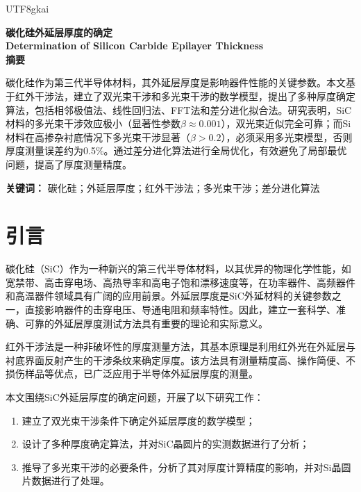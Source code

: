 \documentclass[12pt,a4paper]{article}
\begin{document}
\begin{CJK}{UTF8}{gkai}

\begin{center}
{\fontsize{16pt}{18pt}\selectfont\textbf{碳化硅外延层厚度的确定}}\\[8pt]
{\fontsize{14pt}{16pt}\selectfont\textbf{Determination of Silicon Carbide Epilayer Thickness}}\\[15pt]
{\fontsize{12pt}{14pt}\selectfont\textbf{摘要}}\\[5pt]
\end{center}

\noindent
碳化硅作为第三代半导体材料，其外延层厚度是影响器件性能的关键参数。本文基于红外干涉法，建立了双光束干涉和多光束干涉的数学模型，提出了多种厚度确定算法，包括相邻极值法、线性回归法、FFT法和差分进化拟合法。研究表明，SiC材料的多光束干涉效应极小（显著性参数$\beta\approx0.001$），双光束近似完全可靠；而Si材料在高掺杂衬底情况下多光束干涉显著（$\beta>0.2$），必须采用多光束模型，否则厚度测量误差约为0.5\%。通过差分进化算法进行全局优化，有效避免了局部最优问题，提高了厚度测量精度。

\vspace{8pt}

\noindent
{\textbf{关键词：}} 碳化硅；外延层厚度；红外干涉法；多光束干涉；差分进化算法

\vspace{15pt}

\section{引言}

碳化硅（SiC）作为一种新兴的第三代半导体材料，以其优异的物理化学性能，如宽禁带、高击穿电场、高热导率和高电子饱和漂移速度等，在功率器件、高频器件和高温器件领域具有广阔的应用前景\cite{1}。外延层厚度是SiC外延材料的关键参数之一，直接影响器件的击穿电压、导通电阻和频率特性。因此，建立一套科学、准确、可靠的外延层厚度测试方法具有重要的理论和实际意义。

红外干涉法是一种非破坏性的厚度测量方法，其基本原理是利用红外光在外延层与衬底界面反射产生的干涉条纹来确定厚度\cite{2}。该方法具有测量精度高、操作简便、不损伤样品等优点，已广泛应用于半导体外延层厚度的测量。

本文围绕SiC外延层厚度的确定问题，开展了以下研究工作：

\begin{enumerate}[label=\arabic*.]
\item 建立了双光束干涉条件下确定外延层厚度的数学模型；
\item 设计了多种厚度确定算法，并对SiC晶圆片的实测数据进行了分析；
\item 推导了多光束干涉的必要条件，分析了其对厚度计算精度的影响，并对Si晶圆片数据进行了处理。
\end{enumerate}


\end{CJK}
\end{document}
